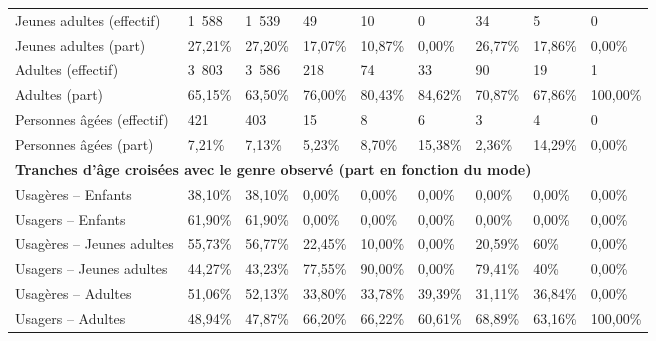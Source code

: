 \begin{longtable}{p{3.7cm}p{0.9cm}p{0.9cm}p{0.9cm}p{0.9cm}p{0.9cm}p{0.9cm}p{0.9cm}p{0.9cm}}
    \small{Jeunes adultes (effectif)} & \small{1~588} & \small{1~539} & \small{49} & \small{10} & \small{0} & \small{34} & \small{5} & \small{0}\\   
    \small{Jeunes adultes (part)} & \small{27,21\%} & \small{27,20\%} & \small{17,07\%} & \small{10,87\%} & \small{0,00\%} & \small{26,77\%} & \small{17,86\%} & \small{0,00\%}\\    
    \small{Adultes (effectif)} & \small{3~803} & \small{3~586} & \small{218} & \small{74} & \small{33} & \small{90} & \small{19} & \small{1}\\    
    \small{Adultes (part)} & \small{65,15\%} & \small{63,50\%} & \small{76,00\%} & \small{80,43\%} & \small{84,62\%} & \small{70,87\%} & \small{67,86\%} & \small{100,00\%}\\    
    \small{Personnes âgées (effectif)} & \small{421} & \small{403} & \small{15} & \small{8} & \small{6} & \small{3} & \small{4} & \small{0}\\    
    \small{Personnes âgées (part)} & \small{7,21\%} & \small{7,13\%} & \small{5,23\%} & \small{8,70\%} & \small{15,38\%} & \small{2,36\%} & \small{14,29\%} & \small{0,00\%}\\    
    \hline
\multicolumn{9}{l}{\textbf{Tranches d'âge croisées avec le genre observé (part en fonction du mode)}}\\
    \small{Usagères – Enfants} & \small{38,10\%} & \small{38,10\%} & \small{0,00\%} & \small{0,00\%} & \small{0,00\%} & \small{0,00\%} & \small{0,00\%} & \small{0,00\%}\\    
    \small{Usagers – Enfants} & \small{61,90\%} & \small{61,90\%} & \small{0,00\%} & \small{0,00\%} & \small{0,00\%} & \small{0,00\%} & \small{0,00\%} & \small{0,00\%}\\    
    \small{Usagères – Jeunes adultes} & \small{55,73\%} & \small{56,77\%} & \small{22,45\%} & \small{10,00\%} & \small{0,00\%} & \small{20,59\%} & \small{60\%} & \small{0,00\%}\\    
    \small{Usagers – Jeunes adultes} & \small{44,27\%} & \small{43,23\%} & \small{77,55\%} & \small{90,00\%} & \small{0,00\%} & \small{79,41\%} & \small{40\%} & \small{0,00\%}\\    
    \small{Usagères – Adultes} & \small{51,06\%} & \small{52,13\%} & \small{33,80\%} & \small{33,78\%} & \small{39,39\%} & \small{31,11\%} & \small{36,84\%} & \small{0,00\%}\\    
    \small{Usagers – Adultes} & \small{48,94\%} & \small{47,87\%} & \small{66,20\%} & \small{66,22\%} & \small{60,61\%} & \small{68,89\%} & \small{63,16\%} & \small{100,00\%}\\    

\end{longtable}
